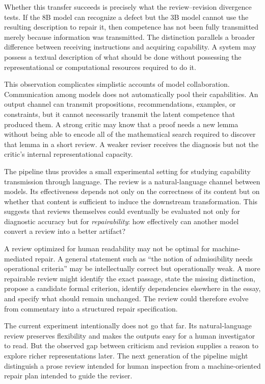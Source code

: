 \documentclass[11pt]{article}
\begin{document}
Whether this transfer succeeds is precisely what the review--revision divergence tests. If the 8B model can recognize a defect but the 3B model cannot use the resulting description to repair it, then competence has not been fully transmitted merely because information was transmitted. The distinction parallels a broader difference between receiving instructions and acquiring capability. A system may possess a textual description of what should be done without possessing the representational or computational resources required to do it.

This observation complicates simplistic accounts of model collaboration. Communication among models does not automatically pool their capabilities. An output channel can transmit propositions, recommendations, examples, or constraints, but it cannot necessarily transmit the latent competence that produced them. A strong critic may know that a proof needs a new lemma without being able to encode all of the mathematical search required to discover that lemma in a short review. A weaker reviser receives the diagnosis but not the critic's internal representational capacity.

The pipeline thus provides a small experimental setting for studying capability transmission through language. The review is a natural-language channel between models. Its effectiveness depends not only on the correctness of its content but on whether that content is sufficient to induce the downstream transformation. This suggests that reviews themselves could eventually be evaluated not only for diagnostic accuracy but for \emph{repairability}: how effectively can another model convert a review into a better artifact?

A review optimized for human readability may not be optimal for machine-mediated repair. A general statement such as ``the notion of admissibility needs operational criteria'' may be intellectually correct but operationally weak. A more repairable review might identify the exact passage, state the missing distinction, propose a candidate formal criterion, identify dependencies elsewhere in the essay, and specify what should remain unchanged. The review could therefore evolve from commentary into a structured repair specification.

The current experiment intentionally does not go that far. Its natural-language review preserves flexibility and makes the outputs easy for a human investigator to read. But the observed gap between criticism and revision supplies a reason to explore richer representations later. The next generation of the pipeline might distinguish a prose review intended for human inspection from a machine-oriented repair plan intended to guide the reviser.
\end{document}

